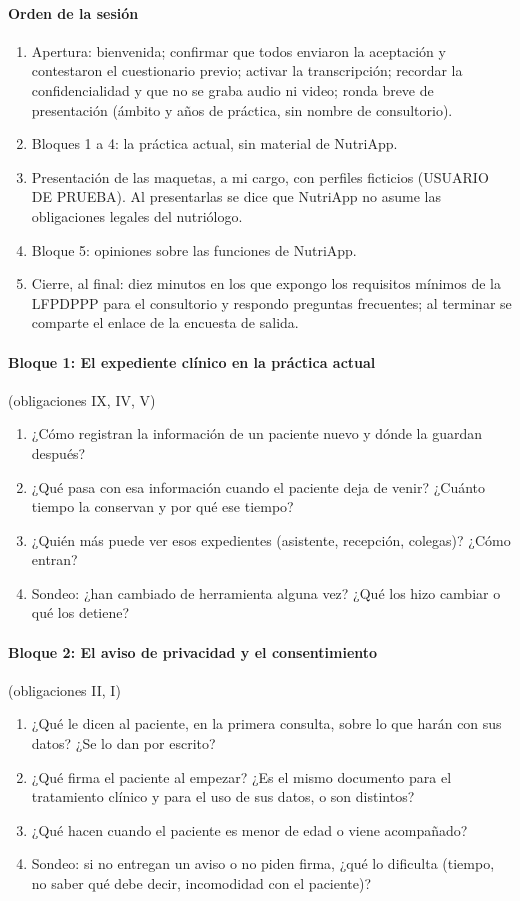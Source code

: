 \documentclass[12pt, a4paper]{article}
\begin{document}
\paragraph{Orden de la sesión}
\begin{enumerate}
  \item Apertura: bienvenida; confirmar que todos enviaron la aceptación y contestaron el cuestionario previo; activar la transcripción; recordar la confidencialidad y que no se graba audio ni video; ronda breve de presentación (ámbito y años de práctica, sin nombre de consultorio).
  \item Bloques 1 a 4: la práctica actual, sin material de NutriApp.
  \item Presentación de las maquetas, a mi cargo, con perfiles ficticios (USUARIO DE PRUEBA). Al presentarlas se dice que NutriApp no asume las obligaciones legales del nutriólogo.
  \item Bloque 5: opiniones sobre las funciones de NutriApp.
  \item Cierre, al final: diez minutos en los que expongo los requisitos mínimos de la LFPDPPP para el consultorio y respondo preguntas frecuentes; al terminar se comparte el enlace de la encuesta de salida.
\end{enumerate}
\paragraph{Bloque 1: El expediente clínico en la práctica actual} (obligaciones IX, IV, V)
\begin{enumerate}
  \item ¿Cómo registran la información de un paciente nuevo y dónde la guardan después?
  \item ¿Qué pasa con esa información cuando el paciente deja de venir? ¿Cuánto tiempo la conservan y por qué ese tiempo?
  \item ¿Quién más puede ver esos expedientes (asistente, recepción, colegas)? ¿Cómo entran?
  \item Sondeo: ¿han cambiado de herramienta alguna vez? ¿Qué los hizo cambiar o qué los detiene?
\end{enumerate}
 
\paragraph{Bloque 2: El aviso de privacidad y el consentimiento} (obligaciones II, I)
\begin{enumerate}
  \item ¿Qué le dicen al paciente, en la primera consulta, sobre lo que harán con sus datos? ¿Se lo dan por escrito?
  \item ¿Qué firma el paciente al empezar? ¿Es el mismo documento para el tratamiento clínico y para el uso de sus datos, o son distintos?
  \item ¿Qué hacen cuando el paciente es menor de edad o viene acompañado?
  \item Sondeo: si no entregan un aviso o no piden firma, ¿qué lo dificulta (tiempo, no saber qué debe decir, incomodidad con el paciente)?
\end{enumerate}
 
\end{document}
